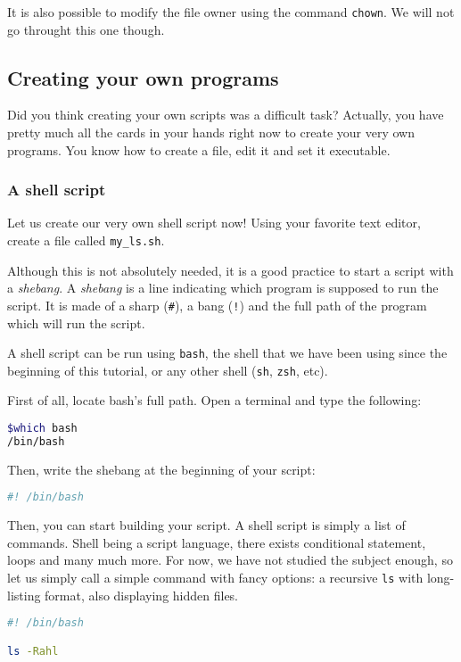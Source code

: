 \documentclass[12pt]{article}
\begin{document}
It is also possible to modify the file owner using the command \texttt{chown}. We will not go throught this one though.


\subsection{Creating your own programs}

Did you think creating your own scripts was a difficult task? Actually, you have pretty much all the cards in your hands right now to create your very own programs. You know how to create a file, edit it and set it executable.

\subsubsection{A shell script}

Let us create our very own shell script now! Using your favorite text editor, create a file called \texttt{my\_ls.sh}.

Although this is not absolutely needed, it is a good practice to start a script with a \textit{shebang}. A \textit{shebang} is a line indicating which program is supposed to run the script. It is made of a sharp (\texttt{\#}), a bang (\texttt{!}) and the full path of the program which will run the script.

A shell script can be run using \texttt{bash}, the shell that we have been using since the beginning of this tutorial, or any other shell (\texttt{sh}, \texttt{zsh}, etc).

First of all, locate bash's full path. Open a terminal and type the following:
\begin{lstlisting}[language=bash]
$which bash
/bin/bash
\end{lstlisting}

Then, write the shebang at the beginning of your script:

\begin{lstlisting}[language=bash]
#! /bin/bash
\end{lstlisting}

Then, you can start building your script. A shell script is simply a list of commands. Shell being a script language, there exists conditional statement, loops and many much more. For now, we have not studied the subject enough, so let us simply call a simple command with fancy options: a recursive \texttt{ls} with long-listing format, also displaying hidden files.

\begin{lstlisting}[language=bash]
#! /bin/bash

ls -Rahl
\end{lstlisting}
\end{document}
